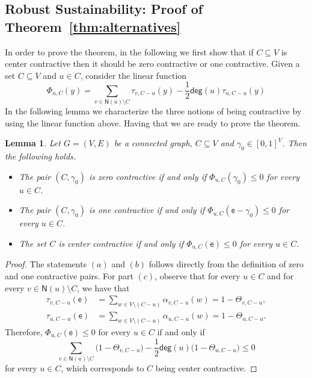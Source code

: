 \documentclass[letterpaper,11pt]{article}
\newcommand{\calF}{\mathcal{F}}
\newcommand{\RR}{\mathsf{R}}
\newcommand{\nsf}{\mathsf{N}}
\newcommand{\degsf}{\mathsf{deg}}
\newtheorem{lemma}{Lemma}
\newcommand{\vvcom}[1]{\todo[color=red!25!white]{Victor: #1}}
\begin{document}
\subsection{Robust Sustainability: Proof of Theorem~\ref{thm:alternatives}}
%
\vvcom{arreglar esto}
In order to prove the theorem, in the following we first show that if $C\subseteq V$ is center contractive then it should be zero contractive or one contractive.
Given a set $C\subseteq V$ and $u\in C$, consider the linear function 
\begin{equation*}
\Phi_{u,C}(y)=\sum_{v\in \nsf(u)\setminus C}\tau_{v,C-u}(y)-\frac{1}{2}\degsf(u)\tau_{u,C-u}(y)
\end{equation*}
In the following lemma we characterize the three notions of being contractive by using the linear function above.
Having that we are ready to prove the theorem.
\begin{lemma}
\label{lem:convexity}
Let $G=(V,E)$ be a connected graph, $C\subseteq V$ and $\gamma_0\in [0,1]^V$.
Then the following holds.
\begin{itemize}
	\item[$(a)$] The pair $(C,\gamma_0)$ is zero contractive if and only if $\Phi_{u,C}(\gamma_0)\le 0$ for every $u\in C$.
	\item[$(b)$] The pair $(C,\gamma_0)$ is one contractive if and only if $\Phi_{u,C}(\mathsf{e}-\gamma_0)\le 0$ for every $u\in C$.
	\item[$(c)$] The set $C$ is center contractive if and only if $\Phi_{u,C}(\mathsf{e})\le 0$ for every $u\in C$.
\end{itemize}
\end{lemma}

\begin{proof}
The statements $(a)$ and $(b)$ follows directly from the definition of zero and one contractive pairs.
For part $(c)$, observe that for every $u\in C$ and for every $v\in \nsf(u)\setminus C$, we have that 
\begin{align*}
\tau_{v,C-u}(\mathsf{e})&=\sum_{w\in V\setminus (C-u)}\alpha_{v,C-u}(w)=1-\Theta_{v,C-u},\\
\tau_{u,C-u}(\mathsf{e})&=\sum_{w\in V\setminus (C-u)}\alpha_{u,C-u}(w)=1-\Theta_{u,C-u}.
\end{align*}
Therefore, $\Phi_{u,C}(\mathsf{e})\le 0$ for every $u\in C$ if and only if 
\begin{equation*}
\sum_{v\in \nsf(u)\setminus C}\Big(1-\Theta_{v,C-u}\Big)-\frac{1}{2}\degsf(u)\Big(1-\Theta_{u,C-u}\Big)\le 0
\end{equation*}
for every $u\in C$, which corresponds to $C$ being center contractive.
\end{proof}
\end{document}
